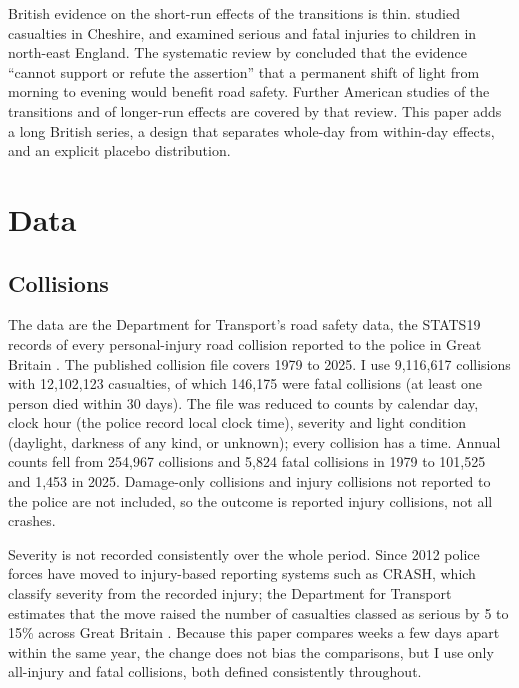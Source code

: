 \documentclass[11pt,a4paper]{article}
\begin{document}
British evidence on the short-run effects of the transitions is thin. \citet{whittaker1996} studied casualties in Cheshire, and \citet{adams2005} examined serious and fatal injuries to children in north-east England. The systematic review by \citet{carey2017} concluded that the evidence ``cannot support or refute the assertion'' that a permanent shift of light from morning to evening would benefit road safety. Further American studies of the transitions and of longer-run effects \citep{meyerhoff1978,ferguson1995,coate2004,sood2007,stevens2006,huang2010} are covered by that review. This paper adds a long British series, a design that separates whole-day from within-day effects, and an explicit placebo distribution.

\section{Data}\label{sec:data}
\subsection{Collisions}
The data are the Department for Transport's road safety data, the STATS19 records of every personal-injury road collision reported to the police in Great Britain \citep{dft2026}. The published collision file covers 1979 to 2025. I use 9,116,617 collisions with 12,102,123 casualties, of which 146,175 were fatal collisions (at least one person died within 30 days). The file was reduced to counts by calendar day, clock hour (the police record local clock time), severity and light condition (daylight, darkness of any kind, or unknown); every collision has a time. Annual counts fell from 254,967 collisions and 5,824 fatal collisions in 1979 to 101,525 and 1,453 in 2025. Damage-only collisions and injury collisions not reported to the police are not included, so the outcome is reported injury collisions, not all crashes.

Severity is not recorded consistently over the whole period. Since 2012 police forces have moved to injury-based reporting systems such as CRASH, which classify severity from the recorded injury; the Department for Transport estimates that the move raised the number of casualties classed as serious by 5 to 15\% across Great Britain \citep{dftseverity2026}. Because this paper compares weeks a few days apart within the same year, the change does not bias the comparisons, but I use only all-injury and fatal collisions, both defined consistently throughout.
\end{document}
